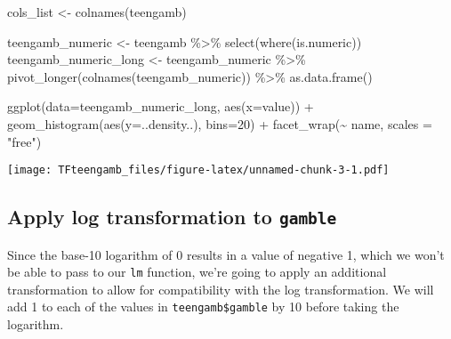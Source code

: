 \documentclass[
]{article}
\newenvironment{Shaded}{\begin{snugshade}}{\end{snugshade}}
\newcommand{\AttributeTok}[1]{\textcolor[rgb]{0.77,0.63,0.00}{#1}}
\newcommand{\DecValTok}[1]{\textcolor[rgb]{0.00,0.00,0.81}{#1}}
\newcommand{\FunctionTok}[1]{\textcolor[rgb]{0.00,0.00,0.00}{#1}}
\newcommand{\NormalTok}[1]{#1}
\newcommand{\OtherTok}[1]{\textcolor[rgb]{0.56,0.35,0.01}{#1}}
\newcommand{\SpecialCharTok}[1]{\textcolor[rgb]{0.00,0.00,0.00}{#1}}
\newcommand{\StringTok}[1]{\textcolor[rgb]{0.31,0.60,0.02}{#1}}
\begin{document}
\begin{Shaded}
\begin{Highlighting}[]
\NormalTok{cols\_list }\OtherTok{\textless{}{-}} \FunctionTok{colnames}\NormalTok{(teengamb)}

\NormalTok{teengamb\_numeric }\OtherTok{\textless{}{-}}\NormalTok{ teengamb }\SpecialCharTok{\%\textgreater{}\%} \FunctionTok{select}\NormalTok{(}\FunctionTok{where}\NormalTok{(is.numeric))}
\NormalTok{teengamb\_numeric\_long }\OtherTok{\textless{}{-}}\NormalTok{ teengamb\_numeric }\SpecialCharTok{\%\textgreater{}\%} \FunctionTok{pivot\_longer}\NormalTok{(}\FunctionTok{colnames}\NormalTok{(teengamb\_numeric)) }\SpecialCharTok{\%\textgreater{}\%} \FunctionTok{as.data.frame}\NormalTok{()}

\FunctionTok{ggplot}\NormalTok{(}\AttributeTok{data=}\NormalTok{teengamb\_numeric\_long, }\FunctionTok{aes}\NormalTok{(}\AttributeTok{x=}\NormalTok{value)) }\SpecialCharTok{+} 
  \FunctionTok{geom\_histogram}\NormalTok{(}\FunctionTok{aes}\NormalTok{(}\AttributeTok{y=}\NormalTok{..density..), }\AttributeTok{bins=}\DecValTok{20}\NormalTok{) }\SpecialCharTok{+} 
  \FunctionTok{facet\_wrap}\NormalTok{(}\SpecialCharTok{\textasciitilde{}}\NormalTok{ name, }\AttributeTok{scales =} \StringTok{"free"}\NormalTok{)}
\end{Highlighting}
\end{Shaded}

\texttt{[image: TFteengamb\_files/figure-latex/unnamed-chunk-3-1.pdf]}

\hypertarget{apply-log-transformation-to-gamble}{%
\subsection{\texorpdfstring{Apply log transformation to
\texttt{gamble}}{Apply log transformation to gamble}}\label{apply-log-transformation-to-gamble}}

Since the base-10 logarithm of 0 results in a value of negative 1, which
we won't be able to pass to our \texttt{lm} function, we're going to
apply an additional transformation to allow for compatibility with the
log transformation. We will add 1 to each of the values in
\texttt{teengamb\$gamble} by 10 before taking the logarithm.

\begin{Shaded}
\end{Shaded}
\end{document}
